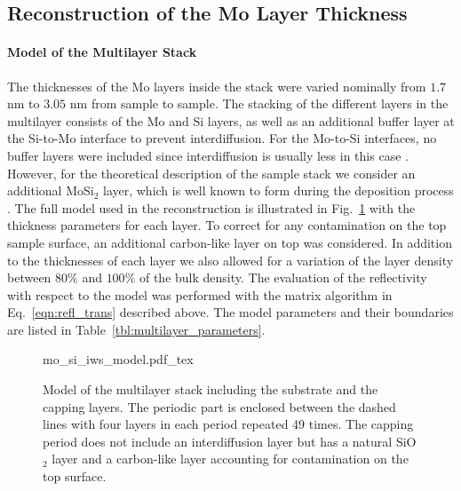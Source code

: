 \subsection{Reconstruction of the Mo Layer Thickness}
\paragraph{Model of the Multilayer Stack} \label{sec:mo_si_model}
The thicknesses of the Mo layers inside the stack were varied nominally from $1.7$ nm to $3.05$ nm from sample to sample. The stacking of the different layers in the multilayer consists of the Mo and Si layers, as well as an additional buffer layer at the Si-to-Mo interface to prevent interdiffusion. For the Mo-to-Si interfaces, no buffer layers were included since interdiffusion is usually less in this case \cite{petford-long_highresolution_1987}. However, for the theoretical description of the sample stack we consider an additional MoSi$_2$ layer, which is well known to form during the deposition process \cite{bajt_investigation_2001}. The full model used in the reconstruction is illustrated in Fig.~\ref{fig:model} with the thickness parameters for each layer. To correct for any contamination on the top sample surface, an additional carbon-like layer on top was considered. In addition to the thicknesses of each layer we also allowed for a variation of the layer density between $80\%$ and $100\%$ of the bulk density. The evaluation of the reflectivity with respect to the model was performed with the matrix algorithm in Eq.~\eqref{eqn:refl_trans} described above. The model parameters and their boundaries are listed in Table~\ref{tbl:multilayer_parameters}.
\begin{figure}[htbp]
    \def\svgwidth{0.7\textwidth}
    \selectfont\footnotesize
    {mo_si_iws_model.pdf_tex}
    \caption{Model of the multilayer stack including the substrate and the capping layers. The periodic part is enclosed between the dashed lines with four layers in each period repeated 49 times. The capping period does not include an interdiffusion layer but has a natural SiO$_2$ layer and a carbon-like layer accounting for contamination on the top surface.}
    \label{fig:model}
\end{figure}
